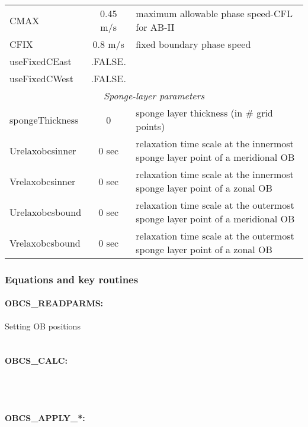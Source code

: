 \begin{table}[h!]
{\begin{tabular}{|l|c|l|}
        CMAX & 0.45 m/s & 
           maximum allowable phase speed-CFL for AB-II \\
        CFIX & 0.8 m/s & 
           fixed boundary phase speed \\
        useFixedCEast & .FALSE. & 
           ~ \\
        useFixedCWest & .FALSE. & 
           ~ \\
      \hline
      \multicolumn{3}{|c|}{\textit{Sponge-layer parameters} } \\
      \hline
        spongeThickness & 0 & 
           sponge layer thickness (in \# grid points) \\
        Urelaxobcsinner & 0 sec & 
           relaxation time scale at the 
           innermost sponge layer point of a meridional OB \\
        Vrelaxobcsinner & 0 sec & 
           relaxation time scale at the 
           innermost sponge layer point of a zonal OB \\
        Urelaxobcsbound & 0 sec & 
           relaxation time scale at the 
           outermost sponge layer point of a meridional OB \\
        Vrelaxobcsbound & 0 sec & 
           relaxation time scale at the 
           outermost sponge layer point of a zonal OB \\
         \hline
      \hline
    \end{tabular}
  }
  \caption{~}
\end{table}




\subsubsection{Equations and key routines
\label{sec:pkg:obcs:equations}}

\paragraph{OBCS\_READPARMS:} Setting OB positions \\
~

\paragraph{OBCS\_CALC:} ~ \\
~

\paragraph{OBCS\_APPLY\_*:} ~ \\
~

